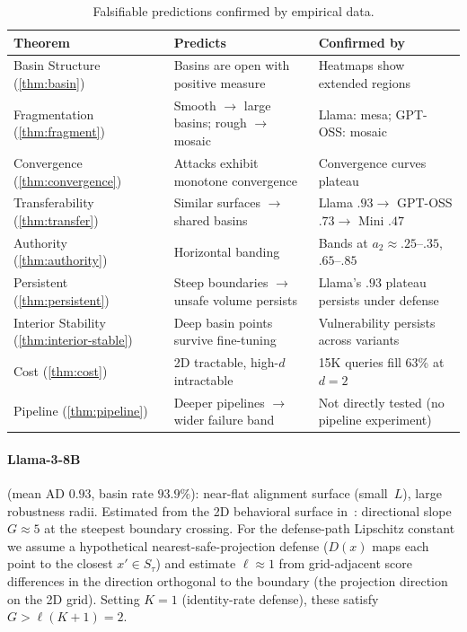 \documentclass[11pt]{article}
\begin{document}
\begin{table}[t]
\centering
\small
\caption{Falsifiable predictions confirmed by empirical data.}
\label{tab:correspondence}
\begin{tabular}{@{}p{3.0cm}p{4.5cm}p{4.5cm}@{}}
\toprule
\textbf{Theorem} & \textbf{Predicts} & \textbf{Confirmed by} \\
\midrule
Basin Structure (\ref{thm:basin})
  & Basins are open with positive measure
  & Heatmaps show extended regions \\[3pt]
Fragmentation (\ref{thm:fragment})
  & Smooth $\to$ large basins; rough $\to$ mosaic
  & Llama: mesa; GPT-OSS: mosaic \\[3pt]
Convergence (\ref{thm:convergence})
  & Attacks exhibit monotone convergence
  & Convergence curves plateau \\[3pt]
Transferability (\ref{thm:transfer})
  & Similar surfaces $\to$ shared basins
  & Llama $.93 \to$ GPT-OSS $.73 \to$ Mini $.47$ \\[3pt]
Authority (\ref{thm:authority})
  & Horizontal banding
  & Bands at $a_2 \approx .25$--$.35$, $.65$--$.85$ \\[3pt]
Persistent (\ref{thm:persistent})
  & Steep boundaries $\to$ unsafe volume persists
  & Llama's $.93$ plateau persists under defense \\[3pt]
Interior Stability (\ref{thm:interior-stable})
  & Deep basin points survive fine-tuning
  & Vulnerability persists across variants \\[3pt]
Cost (\ref{thm:cost})
  & 2D tractable, high-$d$ intractable
  & 15K queries fill 63\% at $d\!=\!2$ \\[3pt]
Pipeline (\ref{thm:pipeline})
  & Deeper pipelines $\to$ wider failure band
  & Not directly tested (no pipeline experiment) \\
\bottomrule
\end{tabular}
\end{table}

\paragraph{Llama-3-8B} (mean AD $0.93$, basin rate $93.9\%$):
near-flat alignment surface (small~$L$), large robustness radii.
Estimated from the 2D behavioral surface in~\cite{munshi2026manifold}: directional slope $G \approx 5$ at the steepest boundary crossing.
For the defense-path Lipschitz constant we assume a hypothetical
nearest-safe-projection defense ($D(x)$ maps each point to the closest
$x' \in S_\tau$) and estimate $\ell \approx 1$ from grid-adjacent
score differences in the direction orthogonal to the boundary
(the projection direction on the 2D grid). Setting $K = 1$
(identity-rate defense), these satisfy $G > \ell(K+1) = 2$.
\end{document}
